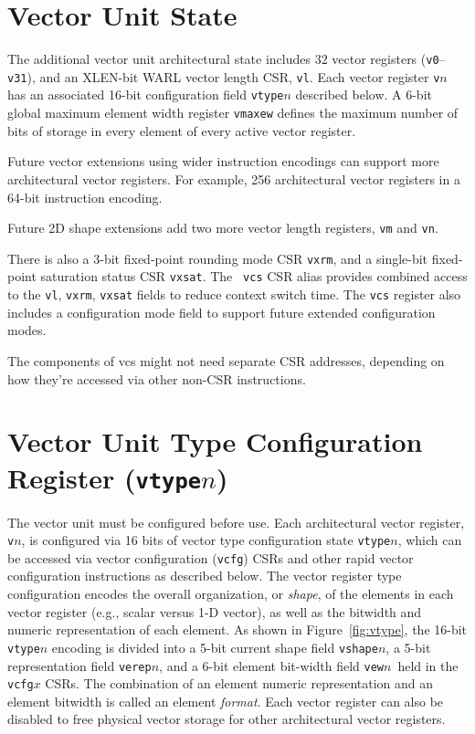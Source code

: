 \section{Vector Unit State}

The additional vector unit architectural state includes 32 vector
registers ({\tt v0}--{\tt v31}), and an XLEN-bit WARL vector length
CSR, {\tt vl}.  Each vector register {\tt v}$n$ has an associated
16-bit configuration field {\tt vtype}$n$ described below. A 6-bit
global maximum element width register {\tt vmaxew} defines the maximum
number of bits of storage in every element of every active vector
register.

\begin{commentary}
  Future vector extensions using wider instruction encodings can
  support more architectural vector registers. For example, 256
  architectural vector registers in a 64-bit instruction encoding.
\end{commentary}

\begin{commentary}
  Future 2D shape extensions add two more vector length registers,
  {\tt vm} and {\tt vn}.
\end{commentary}

There is also a 3-bit fixed-point rounding mode CSR {\tt vxrm}, and a
single-bit fixed-point saturation status CSR {\tt vxsat}.  The {\tt
  vcs} CSR alias provides combined access to the {\tt vl}, {\tt vxrm},
{\tt vxsat} fields to reduce context switch time.  The {\tt vcs}
register also includes a configuration mode field to support future
extended configuration modes.

\begin{discussion}
The components of vcs might not need separate CSR addresses,
depending on how they're accessed via other non-CSR instructions.
\end{discussion}

\section{Vector Unit Type Configuration Register ({\tt vtype}$n$)}

The vector unit must be configured before use.  Each architectural
vector register, {\tt v}$n$, is configured via 16 bits of vector type
configuration state {\tt vtype}$n$, which can be accessed via vector
configuration ({\tt vcfg}) CSRs and other rapid vector configuration
instructions as described below.  The vector register type
configuration encodes the overall organization, or {\em shape}, of the
elements in each vector register (e.g., scalar versus 1-D vector), as
well as the bitwidth and numeric representation of each element.  As
shown in Figure~\ref{fig:vtype}, the 16-bit {\tt vtype}$n$ encoding is
divided into a 5-bit current shape field {\tt vshape}$n$, a 5-bit
representation field {\tt verep}$n$, and a 6-bit element bit-width
field {\tt vew}$n$\, held in the {\tt vcfg}$x$ CSRs.  The combination
of an element numeric representation and an element bitwidth is called
an element {\em format}.  Each vector register can also be disabled to
free physical vector storage for other architectural vector registers.

